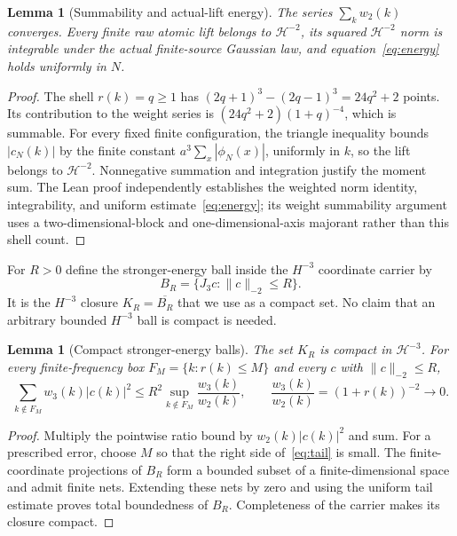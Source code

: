 \documentclass[11pt]{amsart}
\newtheorem{lemma}[theorem]{Lemma}
\theoremstyle{remark}\newtheorem{remark}[theorem]{Remark}
\newcommand{\HH}[1]{\mathcal H^{-#1}}
\newcommand{\norm}[1]{\lVert#1\rVert}
\begin{document}
\begin{lemma}[Summability and actual-lift energy]
The series $\sum_kw_2(k)$ converges. Every finite raw atomic lift belongs to $\HH{2}$, its squared $\HH{2}$ norm is integrable under the actual finite-source Gaussian law, and equation~\eqref{eq:energy} holds uniformly in $N$.
\end{lemma}
\begin{proof}
The shell $r(k)=q\geq1$ has
$(2q+1)^3-(2q-1)^3=24q^2+2$ points. Its contribution to the weight series is $(24q^2+2)(1+q)^{-4}$, which is summable. For every fixed finite configuration, the triangle inequality bounds $|c_N(k)|$ by the finite constant $a^3\sum_x|\phi_N(x)|$, uniformly in $k$, so the lift belongs to $\HH{2}$. Nonnegative summation and integration justify the moment sum. The Lean proof independently establishes the weighted norm identity, integrability, and uniform estimate~\eqref{eq:energy}; its weight summability argument uses a two-dimensional-block and one-dimensional-axis majorant rather than this shell count.
\end{proof}

For $R>0$ define the stronger-energy ball inside the $H^{-3}$ coordinate carrier by
\[
 B_R=\{J_3c:\norm{c}_{-2}\leq R\}.
\]
It is the $H^{-3}$ closure $K_R=\overline{B_R}$ that we use as a compact set. No claim that an arbitrary bounded $H^{-3}$ ball is compact is needed.

\begin{lemma}[Compact stronger-energy balls]\label{lem:compact}
The set $K_R$ is compact in $\HH{3}$. For every finite-frequency box $F_M=\{k:r(k)\leq M\}$ and every $c$ with $\norm{c}_{-2}\leq R$,
\begin{equation}\label{eq:tail}
 \sum_{k\notin F_M}w_3(k)|c(k)|^2
 \leq R^2\sup_{k\notin F_M}\frac{w_3(k)}{w_2(k)},
 \qquad \frac{w_3(k)}{w_2(k)}=(1+r(k))^{-2}\longrightarrow0.
\end{equation}
\end{lemma}
\begin{proof}
Multiply the pointwise ratio bound by $w_2(k)|c(k)|^2$ and sum. For a prescribed error, choose $M$ so that the right side of~\eqref{eq:tail} is small. The finite-coordinate projections of $B_R$ form a bounded subset of a finite-dimensional space and admit finite nets. Extending these nets by zero and using the uniform tail estimate proves total boundedness of $B_R$. Completeness of the carrier makes its closure compact.
\end{proof}
\end{document}
